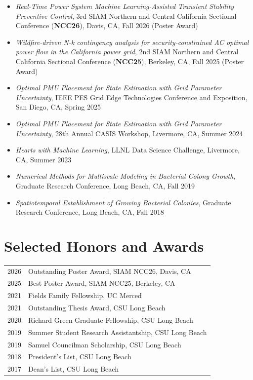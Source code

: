 \documentclass[11pt]{article}
\begin{document}
\begin{itemize}
\item {\it Real-Time Power System Machine Learning-Assisted Transient
  Stability Preventive Control}, 3rd SIAM Northern and Central
  California Sectional Conference ({\bf NCC26}), Davis, CA, Fall 2026
  (Poster Award)
\item {\it Wildfire-driven N-k contingency analysis for
  security-constrained AC optimal power flow in the California power
  grid}, 2nd SIAM Northern and Central California Sectional Conference
  ({\bf NCC25}), Berkeley, CA, Fall 2025 (Poster Award)
\item {\it Optimal PMU Placement for State Estimation with Grid
  Parameter Uncertainty}, IEEE PES Grid Edge Technologies Conference and
  Exposition, San Diego, CA, Spring 2025
\item {\it Optimal PMU Placement for State Estimation with Grid
  Parameter Uncertainty}, 28th Annual CASIS Workshop, Livermore, CA,
  Summer 2024
\item {\it Hearts with Machine Learning}, LLNL Data Science Challenge,
  Livermore, CA, Summer 2023
\item {\it Numerical Methods for Multiscale Modeling in Bacterial Colony
  Growth}, Graduate Research Conference, Long Beach, CA, Fall 2019
\item {\it Spatiotemporal Establishment of Growing Bacterial Colonies},
  Graduate Research Conference, Long Beach, CA, Fall 2018
\end{itemize}

\section*{Selected Honors and Awards}

\noindent
\begin{tabular}{@{}l@{\hspace{1em}}l}
  2026 & Outstanding Poster Award, SIAM NCC26, Davis, CA \\
  2025 & Best Poster Award, SIAM NCC25, Berkeley, CA \\
  2021 & Fields Family Fellowship, UC Merced \\
  2021 & Outstanding Thesis Award, CSU Long Beach \\
  2020 & Richard Green Graduate Fellowship, CSU Long Beach \\
  2019 & Summer Student Research Assistantship, CSU Long Beach \\
  2019 & Samuel Councilman Scholarship, CSU Long Beach \\
  2018 & President's List, CSU Long Beach \\
  2017 & Dean's List, CSU Long Beach
\end{tabular}
\end{document}
